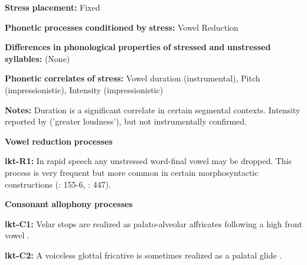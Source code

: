 \documentclass[output=paper]{langsci/langscibook}
\begin{document}
\begin{styleBody}
\textbf{Stress} \textbf{placement:} Fixed
\end{styleBody}

\begin{styleBody}
\textbf{Phonetic} \textbf{processes} \textbf{conditioned} \textbf{by} \textbf{stress:} Vowel Reduction
\end{styleBody}

\begin{styleBody}
\textbf{Differences} \textbf{in} \textbf{phonological} \textbf{properties} \textbf{of} \textbf{stressed} \textbf{and} \textbf{unstressed} \textbf{syllables:} (None)
\end{styleBody}

\begin{styleBody}
\textbf{Phonetic} \textbf{correlates} \textbf{of} \textbf{stress:} Vowel duration (instrumental), Pitch (impressionistic), Intensity (impressionistic)
\end{styleBody}

\begin{styleBody}
\textbf{Notes:} Duration is a significant correlate in certain segmental contexts. Intensity reported by \citet{UllrichEtAl2008} (’greater loudness’), but not instrumentally confirmed.
\end{styleBody}

\begin{styleBody}
\textbf{Vowel} \textbf{reduction} \textbf{processes}
\end{styleBody}

\begin{styleBody}
\textbf{lkt-R1:} In rapid speech any unstressed word-final vowel may be dropped. This process is very frequent but more common in certain morphosyntactic constructions (\citealt{Mirzayan2010}: 155-6, \citealt{TaylorRood1996}: 447).
\end{styleBody}

\begin{styleBody}
\textbf{Consonant} \textbf{allophony} \textbf{processes}
\end{styleBody}

\begin{styleBody}
\textbf{lkt-C1:} Velar stops are realized as palato-alveolar affricates following a high front vowel \citep[6]{Ingham2005}.
\end{styleBody}

\begin{styleBody}
\textbf{lkt-C2:} A voiceless glottal fricative is sometimes realized as a palatal glide \citep{Ingham2005}.
\end{styleBody}
\end{document}
